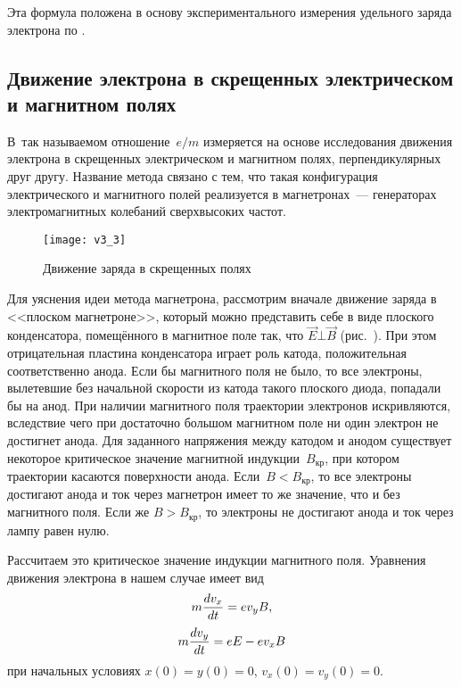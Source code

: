 Эта формула положена в основу экспериментального измерения удельного заряда
электрона по .\label{magnetic focusing}

\subsection{Движение электрона в скрещенных электрическом и магнитном полях}

В~так называемом {} отношение~$e/m$ измеряется на
основе исследования движения электрона в скрещенных электрическом и магнитном
полях, перпендикулярных друг другу. Название метода связано с тем, что такая
конфигурация электрического и магнитного полей реализуется в магнетронах~---
генераторах электромагнитных колебаний
сверхвысоких частот.

\begin{figure}[h!]
	\texttt{[image: v3\_3]}
	\caption{Движение заряда в скрещенных полях}
\end{figure}

Для уяснения идеи метода магнетрона, рассмотрим вначале движение заряда в
<<плоском магнетроне>>, который можно
представить себе в виде плоского конденсатора, помещённого в магнитное поле так,
что $\vec{E}\bot\vec{B}$ (рис.~). При этом отрицательная
пластина конденсатора играет роль катода, положительная соответственно анода.
Если бы магнитного поля не было, то все электроны, вылетевшие без начальной
скорости из катода такого плоского диода, попадали бы на анод. При наличии
магнитного поля траектории электронов искривляются, вследствие чего при
достаточно большом магнитном поле ни один электрон не достигнет анода. Для
заданного напряжения между катодом и анодом существует некоторое критическое
значение магнитной индукции~$B_\text{кр}$, при котором траектории касаются
поверхности анода. Если~$B<B_\text{кр}$, то все электроны достигают анода и ток
через магнетрон имеет то же значение, что и без магнитного поля. Если же
$B>B_\text{кр}$, то электроны не достигают анода и ток через лампу равен нулю.

Рассчитаем это критическое значение индукции магнитного поля. Уравнения движения
электрона в нашем случае имеет вид
\begin{equation}
	\eqmark{3.9}
	m\frac{dv_x}{dt}=ev_y B,
\end{equation}
\begin{equation}
	\eqmark{3.10}
	m\frac{dv_y}{dt}=eE-ev_x B
\end{equation}
при начальных условиях $x(0)=y(0)=0$, $v_x(0)=v_y(0)=0$.

